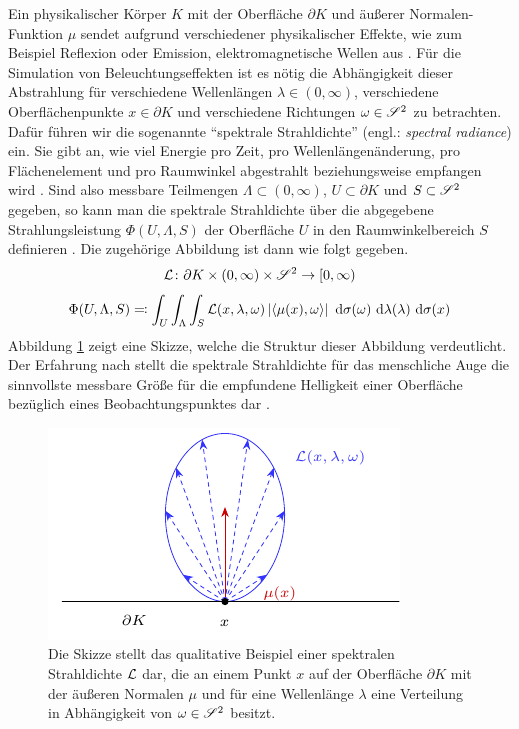 		Ein physikalischer Körper $K$ mit der Oberfläche $\partial K$ und äußerer Normalen-Funktion $\mu$ sendet aufgrund verschiedener physikalischer Effekte, wie zum Beispiel Reflexion oder Emission, elektromagnetische Wellen aus \cite{nolting-edyn}.
		Für die Simulation von Beleuchtungseffekten ist es nötig die Abhängigkeit dieser Abstrahlung für verschiedene Wellenlängen $\lambda\in(0,\infty)$, verschiedene Oberflächenpunkte $x\in\partial K$ und verschiedene Richtungen $\omega\in\mathscr{S}^{2}$ zu betrachten.
		Dafür führen wir die sogenannte \enquote{spektrale Strahldichte} (engl.: \textit{spectral radiance}) ein.
		Sie gibt an, wie viel Energie pro Zeit, pro Wellenlängenänderung, pro Flächenelement und pro Raumwinkel abgestrahlt beziehungsweise empfangen wird \cite{intro-radiometry,malacara-colorimetry,ohta-colorimetry}.
		Sind also messbare Teilmengen $\Lambda\subset (0,\infty)$, $U\subset \partial K$ und $S\subset\mathscr{S}^{2}$ gegeben, so kann man die spektrale Strahldichte über die abgegebene Strahlungsleistung $\Phi(U,\Lambda,S)$ der Oberfläche $U$ in den Raumwinkelbereich $S$ definieren \cite{intro-radiometry}.
		Die zugehörige Abbildung ist dann wie folgt gegeben.
		\[
			\mathcal{L}\colon\partial K\times(0,\infty)\times \mathscr{S}^{2}\to[0,\infty)
		\]
		\[
			\Phi(U,\Lambda,S) \eqqcolon \int_{U}^{}  \int_{\Lambda}^{}  \int_{S}^{}  \mathcal{L}(x,\lambda,\omega)\left\vert \left\langle \mu(x),\omega \right\rangle \right\vert \ \mathrm{d} \sigma(\omega) \ \mathrm{d} \lambda(\lambda) \ \mathrm{d} \sigma(x)
		\]
		Abbildung \ref{fig:radiance} zeigt eine Skizze, welche die Struktur dieser Abbildung verdeutlicht.
		Der Erfahrung nach stellt die spektrale Strahldichte für das menschliche Auge die sinnvollste messbare Größe für die empfundene Helligkeit einer Oberfläche bezüglich eines Beobachtungspunktes dar \cite{malacara-colorimetry,ohta-colorimetry}.

		\begin{figure}[h]
			\center
			\includegraphics{gg_fig/radiance_1.pdf}
			\caption{Die Skizze stellt das qualitative Beispiel einer spektralen Strahldichte $\mathcal{L}$ dar, die an einem Punkt $x$ auf der Oberfläche $\partial K$ mit der äußeren Normalen $\mu$ und für eine Wellenlänge $\lambda$ eine Verteilung in Abhängigkeit von $\omega\in\mathscr{S}^{2}$ besitzt.}
			\label{fig:radiance}
		\end{figure}

